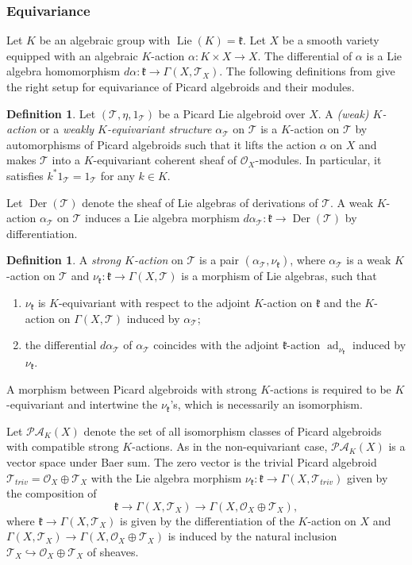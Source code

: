 \documentclass[11pt, a4paper]{amsart}
\newcommand{\fk}{\mathfrak{k}}
\DeclareMathOperator{\Lie}{Lie}
\DeclareMathOperator{\ad}{ad}
\DeclareMathOperator{\der}{Der}
\newcommand{\T}{\mathcal{T}}
\newcommand{\TT}{\mathscr{T}}
\newcommand{\PicAlg}{\mathscr{PA}}
\newcommand{\OO}{\mathcal{O}}
\theoremstyle{definition}
\newtheorem{defi}[Thm]{Definition}
\numberwithin{equation}{section}
\begin{document}
\subsubsection{Equivariance} \label{subsubsec:pic_equiv}

Let $K$ be an algebraic group with $\Lie(K) = \fk$. Let $X$ be a smooth variety equipped with an algebraic $K$-action $\alpha: K \times X \to X$. The differential of $\alpha$ is a Lie algebra homomorphism $d \alpha: \fk \to \Gamma(X, \T_X)$. The following definitions from \cite[Section 1.8]{BeilinsonBernstein} give the right setup for equivariance of Picard algebroids and their modules.

\begin{defi}\label{defn:pic_action}
	Let $(\TT, \eta, 1_\TT)$ be a Picard Lie algebroid over $X$. A {\it (weak) $K$-action} or a {\it weakly $K$-equivariant structure} $\alpha_\TT$ on $\TT$ is a $K$-action on $\TT$ by automorphisms of Picard algebroids such that it lifts the action $\alpha$ on $X$ and makes $\TT$ into a $K$-equivariant coherent sheaf of $\OO_X$-modules. In particular, it satisfies $k^* 1_\TT = 1_\TT$ for any $k \in K$.
\end{defi}

Let $\der(\TT)$ denote the sheaf of Lie algebras of derivations of $\TT$. A weak $K$-action $\alpha_\TT$ on $\TT$ induces a Lie algebra morphism $d\alpha_\TT: \fk \to \der(\TT)$ by differentiation.

\begin{defi}\label{defn:strong_pic_action}
	A {\it strong $K$-action} on $\TT$ is a pair $(\alpha_\TT, \nu_\fk)$, where $\alpha_\TT$ is a weak $K$-action on $\TT$ and $\nu_\fk: \fk \to \Gamma(X, \TT)$ is a morphism of Lie algebras, such that
	\begin{enumerate}[label=(\roman*)]
		\item
		$\nu_\fk$ is $K$-equivariant with respect to the adjoint $K$-action on $\fk$ and the $K$-action on $\Gamma(X, \TT)$ induced by $\alpha_\TT$;
		\item
		the differential $d\alpha_\TT$ of $\alpha_\TT$ coincides with the adjoint $\fk$-action $\ad_{\nu_\fk}$ induced by $\nu_\fk$.
	\end{enumerate}
A morphism between Picard algebroids with strong $K$-actions is required to be $K$-equivariant and intertwine the $\nu_\fk$'s, which is necessarily an isomorphism. 

Let $\PicAlg_K(X)$ denote the set of all isomorphism classes of Picard algebroids with compatible strong $K$-actions. As in the non-equivariant case, $\PicAlg_K(X)$ is a vector space under Baer sum. The zero vector is the trivial Picard algebroid $\TT_{triv} = \OO_X \oplus \T_X$ with the Lie algebra morphism $\nu_\fk: \fk \to \Gamma(X, \TT_{triv})$ given by the composition of 
\begin{equation} \label{eq:nu_triv_pic}
	\fk \to \Gamma(X, \T_X) \to \Gamma(X, \OO_X \oplus \T_X),
\end{equation} 
where $\fk \to \Gamma(X, \T_X)$ is given by the differentiation of the $K$-action on $X$ and $\Gamma(X, \T_X) \to \Gamma(X, \OO_X \oplus \T_X)$ is induced by the natural inclusion $\T_X \hookrightarrow \OO_X \oplus \T_X$ of sheaves.
\end{defi}
\end{document}
